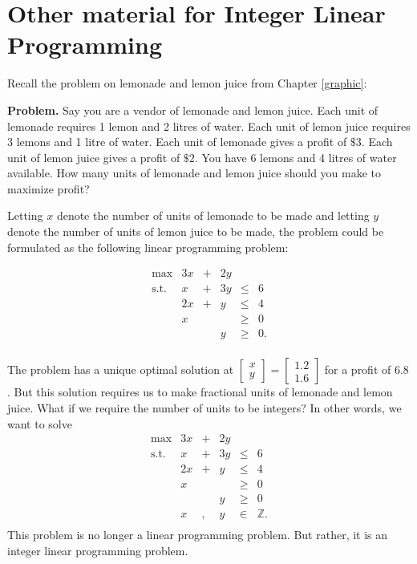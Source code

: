 %

\section{Other material for Integer Linear Programming}\label{integer-linear-programming}

Recall the problem on lemonade and lemon juice from Chapter
\ref{graphic}:

\textbf{Problem.} Say you are a vendor of lemonade and lemon juice. Each
unit of lemonade requires 1 lemon and 2 litres of water. Each unit of
lemon juice requires 3 lemons and 1 litre of water. Each unit of
lemonade gives a profit of \(\$ 3\). Each unit of lemon juice gives a
profit of \(\$ 2\). You have 6 lemons and 4 litres of water available.
How many units of lemonade and lemon juice should you make to maximize
profit?

Letting \(x\) denote the number of units of lemonade to be made and
letting \(y\) denote the number of units of lemon juice to be made, the
problem could be formulated as the following linear programming problem:

\[\begin{array}{rrcrll}
\max & 3x & + & 2y & \\
\text{s.t.} 
& x & + & 3y & \leq & 6 \\
& 2x & +&  y & \leq & 4 \\
& x &  & & \geq & 0 \\
& & & y & \geq & 0. \\
\end{array}\]

The problem has a unique optimal solution at
\(\begin{bmatrix} x \\ y\end{bmatrix} = \begin{bmatrix} 1.2 \\ 1.6\end{bmatrix}\)
for a profit of \(6.8\). But this solution requires us to make
fractional units of lemonade and lemon juice. What if we require the
number of units to be integers? In other words, we want to solve
\[\begin{array}{rrcrll}
\max & 3x & + & 2y & \\
\text{s.t.} 
& x & + & 3y & \leq & 6 \\
& 2x & +&  y & \leq & 4 \\
& x &  & & \geq & 0 \\
& & & y & \geq & 0 \\
& x &,& y & \in  & \mathbb{Z}. \\
\end{array}\] This problem is no longer a linear programming problem.
But rather, it is an integer linear programming problem.

